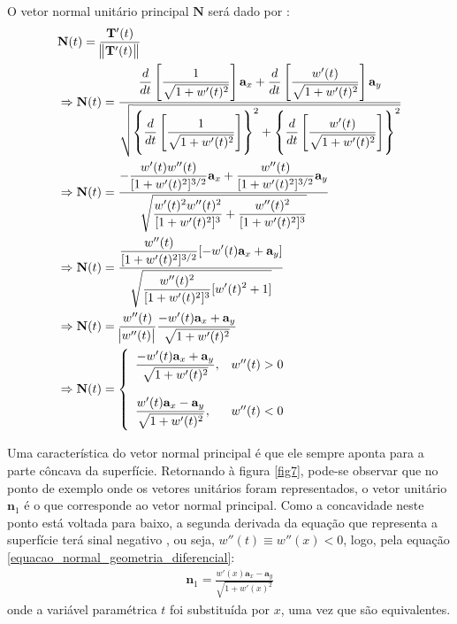 O vetor normal unitário principal $\mathbf{N}$ será dado por \citep{livro_stewart_2}:
\begin{align}
& \mathbf{N}(t) = \frac{\mathbf{T}'(t)}{\norm{\mathbf{T}'(t)}} \nonumber \\
& \Rightarrow \mathbf{N}(t) = \frac{ \displaystyle\frac{d}{dt}\left[\frac{1}{\sqrt{1 + w'(t)^2}}\right]\mathbf{a}_x
	+
	\displaystyle\frac{d}{dt}\left[\frac{w'(t)}{\sqrt{1 + w'(t)^2}}\right]\mathbf{a}_y }
{\sqrt{ \left\lbrace \displaystyle\frac{d}{dt}\left[\frac{1}{\sqrt{1 + w'(t)^2}}\right] \right\rbrace ^2
		+
		\left\lbrace \displaystyle\frac{d}{dt}\left[\frac{w'(t)}{\sqrt{1 + w'(t)^2}}\right] \right\rbrace ^2 }} \nonumber \\
& \Rightarrow \mathbf{N}(t) = \frac{ -\displaystyle \frac{w'(t)w''(t)}{[1 + w'(t)^2]^{3/2}} \mathbf{a}_x
	+
	\displaystyle \frac{w''(t)}{[1 + w'(t)^2]^{3/2}} \mathbf{a}_y }
{\sqrt{ \displaystyle \frac{w'(t)^2 w''(t)^2}{[1 + w'(t)^2]^3} 
		+
		\displaystyle \frac{w''(t)^2}{[1 + w'(t)^2]^{3}} }} \nonumber \\
& \Rightarrow \mathbf{N}(t) = \frac{ \displaystyle\frac{w''(t)}{[1 + w'(t)^2]^{3/2}} [-w'(t)\mathbf{a}_x + \mathbf{a}_y] }
{\sqrt{ \displaystyle \frac{w''(t)^2}{[1 + w'(t)^2]^3} [w'(t)^2	+ 1] }} \nonumber \\
& \Rightarrow \mathbf{N}(t) = \frac{w''(t)}{\abs{w''(t)}} \frac{ -w'(t)\mathbf{a}_x + \mathbf{a}_y }
{\sqrt{ 1 + w'(t)^2 }} \nonumber \\
& \Rightarrow \mathbf{N}(t) = \left\lbrace\begin{array}{ll}
\displaystyle\frac{ -w'(t)\mathbf{a}_x + \mathbf{a}_y}{\sqrt{ 1 + w'(t)^2 }}, & w''(t) > 0 \\ \\
\displaystyle\frac{ w'(t)\mathbf{a}_x - \mathbf{a}_y}{\sqrt{ 1 + w'(t)^2 }}, & w''(t) < 0
\end{array}\right.
\label{equacao_normal_geometria_diferencial}
\end{align}

Uma característica do vetor normal principal é que ele sempre aponta para a parte côncava da superfície. Retornando à figura \ref{fig7}, pode-se observar que no ponto de exemplo onde os vetores unitários foram representados, o vetor unitário $\mathbf{n}_1$ é o que corresponde ao vetor normal principal. Como a concavidade neste ponto está voltada para baixo, a segunda derivada da equação que representa a superfície terá sinal negativo \citep{livro_stewart_1}, ou seja, $w''(t) \equiv w''(x) < 0$, logo, pela equação \eqref{equacao_normal_geometria_diferencial}:
\begin{align}
\mathbf{n}_1 = \frac{ w'(x)\mathbf{a}_x - \mathbf{a}_y }{\sqrt{ 1 + w'(x)^2 }} \label{equacao_normal_geometria_diferencial_1}
\end{align}
onde a variável paramétrica $t$ foi substituída por $x$, uma vez que são equivalentes.

